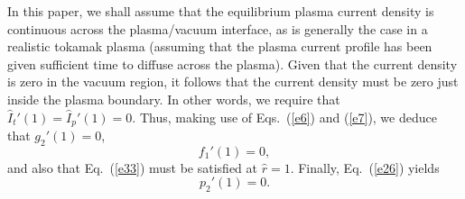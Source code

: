 \documentclass[12pt,prb,aps]{revtex4-1}
\begin{document}
In this paper, we shall assume that the equilibrium plasma current density is continuous across the plasma/vacuum interface, as is generally the case in a realistic tokamak plasma (assuming that the plasma current profile has been given sufficient time to diffuse across the plasma). Given that  
the current density is zero in the vacuum region, it follows that the current density must be zero just inside the plasma boundary. In other words,
we require that 
$\hat{I}_t'(1) = \hat{I}_p'(1)= 0$.
Thus,  making use of Eqs.~(\ref{e6}) and (\ref{e7}), we deduce that $g_2'(1)=0$, 
\begin{equation}\label{f2p}
f_1'(1) = 0,
\end{equation}
and also that Eq.~(\ref{e33}) must be satisfied at $\hat{r}=1$. Finally, Eq.~(\ref{e26}) yields
\begin{equation}
p_2'(1) = 0.\label{p2p}
\end{equation}
\end{document}
